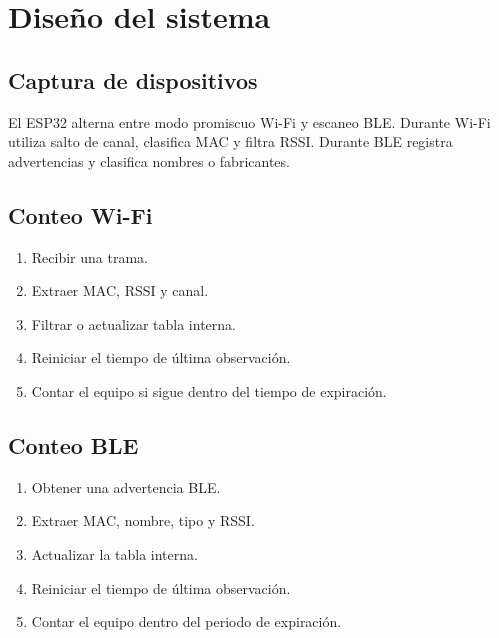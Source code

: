 \documentclass[12pt,a4paper]{article}
\begin{document}
\section{Diseño del sistema}
\subsection{Captura de dispositivos}
El ESP32 alterna entre modo promiscuo Wi-Fi y escaneo BLE. Durante Wi-Fi utiliza salto de canal, clasifica MAC y filtra RSSI. Durante BLE registra advertencias y clasifica nombres o fabricantes.

\subsection{Conteo Wi-Fi}
\begin{enumerate}
\item Recibir una trama.
\item Extraer MAC, RSSI y canal.
\item Filtrar o actualizar tabla interna.
\item Reiniciar el tiempo de última observación.
\item Contar el equipo si sigue dentro del tiempo de expiración.
\end{enumerate}

\subsection{Conteo BLE}
\begin{enumerate}
\item Obtener una advertencia BLE.
\item Extraer MAC, nombre, tipo y RSSI.
\item Actualizar la tabla interna.
\item Reiniciar el tiempo de última observación.
\item Contar el equipo dentro del periodo de expiración.
\end{enumerate}
\end{document}
